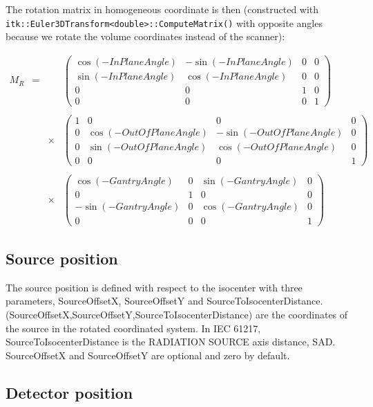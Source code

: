 \documentclass{article}
\begin{document}
The rotation matrix in homogeneous coordinate is then (constructed with\\ \verb+itk::Euler3DTransform<double>::ComputeMatrix()+ with opposite angles because we rotate the volume coordinates instead of the scanner):

$$
\begin{array}{lcll}
  M_R & = & & %
  \begin{pmatrix}
    \cos(-InPlaneAngle) & -\sin(-InPlaneAngle) & 0 & 0\\
    \sin(-InPlaneAngle) & \cos(-InPlaneAngle) & 0 & 0\\
    0 & 0 & 1 & 0\\
    0 & 0 & 0 & 1
  \end{pmatrix} \\
  \\ & & \times & %
  \begin{pmatrix}
    1 & 0 & 0 & 0\\
    0 & \cos(-OutOfPlaneAngle) & -\sin(-OutOfPlaneAngle) & 0\\
    0 & \sin(-OutOfPlaneAngle) & \cos(-OutOfPlaneAngle) & 0\\
    0 & 0 & 0 & 1
  \end{pmatrix} \\
  \\ & & \times & %
  \begin{pmatrix}
    \cos(-GantryAngle) & 0 & \sin(-GantryAngle) & 0 \\
    0 & 1 & 0 & 0 \\
    -\sin(-GantryAngle) & 0 & \cos(-GantryAngle) & 0 \\
    0 & 0 & 0 & 1
  \end{pmatrix}
\end{array}
$$

\subsection{Source position}

The source position is defined with respect to the isocenter with three parameters, SourceOffsetX, SourceOffsetY and SourceToIsocenterDistance. (SourceOffsetX,SourceOffsetY,SourceToIsocenterDistance) are the coordinates of the source in the rotated coordinated system. In IEC 61217, SourceToIsocenterDistance is the RADIATION SOURCE axis distance, SAD. SourceOffsetX and SourceOffsetY are optional and zero by default.

\subsection{Detector position}
\end{document}
